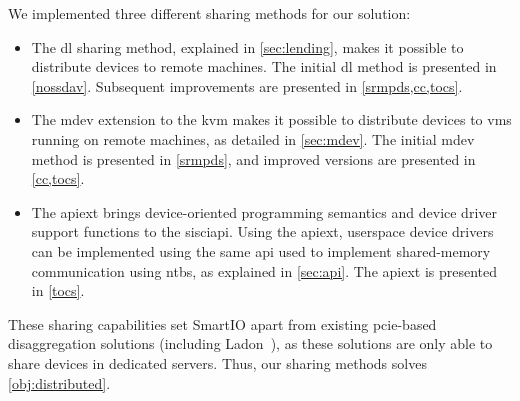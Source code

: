 We implemented three different sharing methods for our solution: 
%
\begin{itemize}
    \item The \gls{dl} sharing method, explained in \cref{sec:lending}, makes it possible to distribute devices to remote machines.
        The initial \gls{dl} method is presented in \cref{nossdav}. Subsequent improvements are presented in \cref{srmpds,cc,tocs}.



    \item The \gls{mdev} extension to the \gls{kvm} makes it possible to distribute devices to \glspl{vm} running on remote machines, as detailed in \cref{sec:mdev}.
        The initial \gls{mdev} method is presented in \cref{srmpds}, and improved versions are presented in \cref{cc,tocs}.


    \item The \gls{apiext} brings device-oriented programming semantics and device driver support functions to the \gls{sisciapi}.
        Using the \gls{apiext}, \gls{userspace} device drivers can be implemented using the same \gls{api} used to implement shared-memory communication using \glspl{ntb}, as explained in \cref{sec:api}.
        The \gls{apiext} is presented in \cref{tocs}.
\end{itemize}
%
These sharing capabilities set SmartIO apart from existing \gls{pcie}-based \gls{disaggregation} solutions (including Ladon~\cite{Tu2013}), as these solutions are only able to share devices in dedicated servers.
%
Thus, our sharing methods solves \cref*{obj:distributed}.





